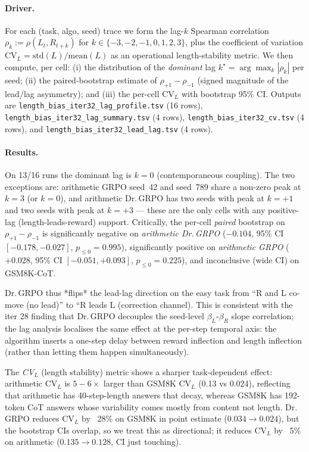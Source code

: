 \documentclass{article}
\begin{document}
\paragraph{Driver.}
For each (task, algo, seed) trace we form the lag-$k$ Spearman
correlation
$\rho_k := \rho(L_t, R_{t{+}k})$ for $k \in \{-3,-2,-1,0,1,2,3\}$,
plus the coefficient of variation $\mathrm{CV}_L = \mathrm{std}(L)/\mathrm{mean}(L)$
as an operational length-stability metric. We then compute, per cell:
(i) the distribution of the \emph{dominant} lag $k^\star =
\arg\max_{k}|\rho_k|$ per seed; (ii) the paired-bootstrap estimate of
$\rho_{+1} - \rho_{-1}$ (signed magnitude of the lead/lag asymmetry); and
(iii) the per-cell $\mathrm{CV}_L$ with bootstrap 95\% CI. Outputs are
\texttt{length\_bias\_iter32\_lag\_profile.tsv} (16 rows),
\texttt{length\_bias\_iter32\_lag\_summary.tsv} (4 rows),
\texttt{length\_bias\_iter32\_cv.tsv} (4 rows), and
\texttt{length\_bias\_iter32\_lead\_lag.tsv} (4 rows).

\paragraph{Results.}
On 13/16 runs the dominant lag is $k{=}0$ (contemporaneous coupling).
The two exceptions are: arithmetic GRPO seed~42 and seed~789 share a
non-zero peak at $k{=}3$ (or $k{=}0$), and arithmetic Dr.\,GRPO has two
seeds with peak at $k{=}{+}1$ and two seeds with peak at $k{=}{+}3$
--- these are the only cells with any positive-lag (length-leads-reward)
support. Critically, the per-cell \emph{paired} bootstrap on
$\rho_{+1} - \rho_{-1}$ is significantly negative on \emph{arithmetic
Dr.\,GRPO} ($-0.104$, 95\% CI $[-0.178, -0.027]$, $p_{\le 0}{=}0.995$),
significantly positive on \emph{arithmetic GRPO} ($+0.028$, 95\% CI
$[-0.051, +0.093]$, $p_{\le 0}{=}0.225$), and inconclusive (wide CI) on
GSM8K-CoT.

Dr.\,GRPO thus *flips* the lead-lag direction on the easy task from
``R and L co-move (no lead)'' to ``R leads L (correction channel).
This is consistent with the iter 28 finding that Dr.\,GRPO decouples
the seed-level $\beta_L$-$\beta_R$ slope correlation; the lag analysis
localises the same effect at the per-step temporal axis: the algorithm
inserts a one-step delay between reward inflection and length
inflection (rather than letting them happen simultaneously).

The \emph{CV}$_L$ (length stability) metric shows a sharper task-dependent
effect: arithmetic CV$_L$ is $5{-}6\times$ larger than GSM8K CV$_L$
(0.13 vs 0.024), reflecting that arithmetic has 40-step-length answers
that decay, whereas GSM8K has 192-token CoT answers whose variability
comes mostly from content not length. Dr.\,GRPO reduces CV$_L$ by
~28\% on GSM8K in point estimate ($0.034 \to 0.024$), but the bootstrap
CIs overlap, so we treat this as directional; it reduces CV$_L$ by ~5\% on
arithmetic ($0.135 \to 0.128$, CI just touching).
\end{document}
